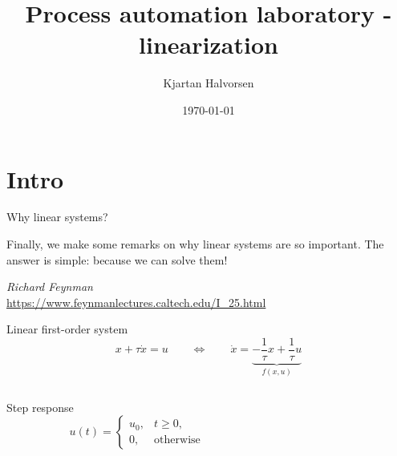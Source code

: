 \documentclass[presentation,aspectratio=169]{beamer}
\author{Kjartan Halvorsen}
\date{\today}
\title{Process automation laboratory - linearization}
\begin{document}
\maketitle

\section{Intro}
\label{sec:org2a31e83}
\begin{frame}[label={sec:org5961aaf}]{Why linear systems?}
\setlength{}
\epigraph{Finally, we make some remarks on why linear systems are so important. The answer is simple: because we can solve them!}{\textit{Richard Feynman}\\\url{https://www.feynmanlectures.caltech.edu/I_25.html}}
\end{frame}

\begin{frame}[label={sec:orgce40fa2}]{Linear first-order system}
\[ x + \tau \dot{x} = u \qquad \Leftrightarrow \qquad \dot{x} = \underbrace{-\frac{1}{\tau}x + \frac{1}{\tau} u}_{f(x, u)} \]

\begin{columns}
\begin{column}{0.4\columnwidth}
Step response \[u(t) = \begin{cases} u_0, & t \ge 0,\\ 0, & \text{otherwise} \end{cases}\]
\end{column}

\begin{column}{0.6\columnwidth}
\begin{center}
\end{center}
\end{column}
\end{columns}
\end{frame}
\end{document}
